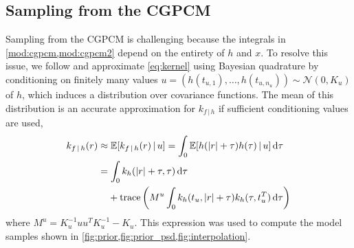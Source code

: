 \documentclass{article}
\newcommand{\id}[1]{\, \mathrm{d} #1}     %
\newcommand{\cond}{\, | \,}               %
\newcommand{\phan}[1]{\hphantom{#1\;}}
\begin{document}
\subsection{Sampling from the CGPCM}
Sampling from the CGPCM is challenging because the integrals in \cref{mod:cgpcm,mod:cgpcm2} depend on the entirety of $h$ and $x$. To resolve this issue, we follow \citet{Tobar:2015:Learning_Stationary} and approximate \cref{eq:kernel} using Bayesian quadrature \cite{Minka:2000:Quadrature_GP} by conditioning on finitely many values $u=(h(t_{u,1}),\ldots,h(t_{u,n_u}))\sim \mathcal{N}(0,K_u)$ of $h$, which induces a  distribution over covariance functions. The mean of this distribution is an accurate approximation for $k_{f\cond h}$ if sufficient conditioning values are used,
\begin{align*}
    k_{f\cond h}(r)
    &\approx \mathbb{E}[k_{f\cond h}(r)\cond u]
    = \int_{0} \mathbb{E}[h(|r| + \tau) h(\tau)\cond u] \id{\tau} \\
    &= \int_0 k_h(|r| + \tau, \tau) \id{\tau} \\
    &\phan{=}+ \mathrm{trace} \left( M^u \int_{0} k_h(t_u, |r|+ \tau)k_h(\tau, t_u^T) \id{\tau} \right)
\end{align*}
where $M^{u}=K_u^{-1}uu^T K_u^{-1}-K_u$. This expression was used to compute the model samples shown in \cref{fig:prior,fig:prior_psd,fig:interpolation}. %
\end{document}
